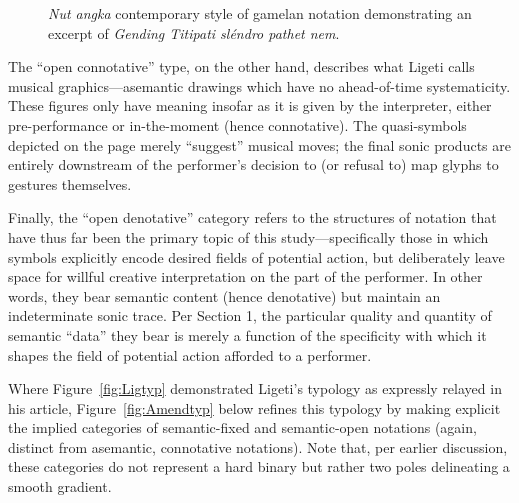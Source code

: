     \begin{figure}
        \centering
        \captionsetup{width=.5\textwidth}
        \caption[\textit{Nut angka} contemporary style of gamelan notation demonstrating an excerpt of \textit{Gending Titipati sléndro pathet nem}.]{\textit{Nut angka} contemporary style of gamelan notation demonstrating an excerpt of \textit{Gending Titipati sléndro pathet nem}.\footnotemark}
        \label{fig:gamelannot}
    \end{figure}

    \noindent The ``open connotative'' type, on the other hand, describes what Ligeti calls musical graphics---asemantic drawings which have no ahead-of-time systematicity. These figures only have meaning insofar as it is given by the interpreter, either pre-performance or in-the-moment (hence connotative). The quasi-symbols depicted on the page merely ``suggest'' musical moves; the final sonic products are entirely downstream of the performer's decision to (or refusal to) map glyphs to gestures themselves.
    
    
    Finally, the ``open denotative'' category refers to the structures of notation that have thus far been the primary topic of this study---specifically those in which symbols explicitly encode desired fields of potential action, but deliberately leave space for willful creative interpretation on the part of the performer. In other words, they bear semantic content (hence denotative) but maintain an indeterminate sonic trace. Per Section 1, the particular quality and quantity of semantic ``data'' they bear is merely a function of the specificity with which it shapes the field of potential action afforded to a performer. 

    Where Figure~\ref{fig:Ligtyp} demonstrated Ligeti's typology as expressly relayed in his article, Figure~\ref{fig:Amendtyp} below refines this typology by making explicit the implied categories of semantic-fixed and semantic-open notations (again, distinct from asemantic, connotative notations). Note that, per earlier discussion, these categories do not represent a hard binary but rather two poles delineating a smooth gradient.

